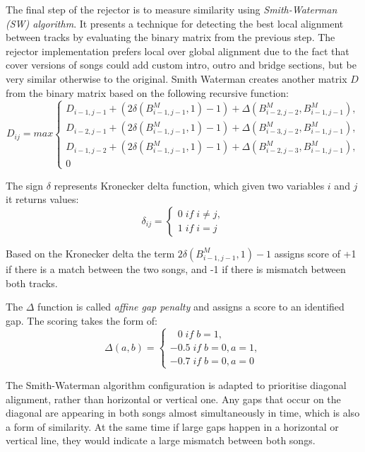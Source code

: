 The final step of the rejector is to measure similarity using
\textit{Smith-Waterman (SW) algorithm}. It presents a technique for detecting
the best local alignment between tracks by evaluating the binary matrix from the
previous step. The rejector implementation prefers local over global alignment
due to the fact that cover versions of songs could add custom intro, outro and
bridge sections, but be very similar otherwise to the original. Smith Waterman
creates another matrix $D$ from the binary matrix based on the following
recursive function:
\begin{equation}
   D_{ij} = max \begin{cases}
    D_{i-1, j-1} + (2\delta(B^M_{i-1, j-1}, 1) - 1) + \Delta(B^M_{i-2, j-2}, B^M_{i-1, j-1}), \\
    D_{i-2, j-1} + (2\delta(B^M_{i-1, j-1}, 1) - 1) + \Delta(B^M_{i-3, j-2}, B^M_{i-1, j-1}), \\
    D_{i-1, j-2} + (2\delta(B^M_{i-1, j-1}, 1) - 1) + \Delta(B^M_{i-2, j-3}, B^M_{i-1, j-1}), \\
    0
   \end{cases}
   \label{eq:sw}
\end{equation}

The sign $\delta$ represents Kronecker delta function, which given two variables
$i$ and $j$ it returns values:
\begin{equation}
    \delta_{ij} = \begin{cases}
       0\; if \; i \neq j, \\
       1\; if \; i = j
    \end{cases}
\end{equation}

Based on the Kronecker delta the term $2\delta(B^M_{i-1, j-1}, 1) - 1$ assigns
score of +1 if there is a match between the two songs, and -1 if there is
mismatch between both tracks.

The $\Delta$ function is called \textit{affine gap penalty} and assigns a score
to an identified gap. The scoring takes the form of:
\begin{equation}
    \Delta(a, b) = \begin{cases}
        \;\;\:0\; if \; b = 1, \\
       -0.5\; if \; b = 0, a = 1, \\
       -0.7\; if \; b = 0, a = 0 
    \end{cases}
\end{equation}

The Smith-Waterman algorithm configuration is adapted to prioritise diagonal
alignment, rather than horizontal or vertical one. Any gaps that occur on the
diagonal are appearing in both songs almost simultaneously in time, which is
also a form of similarity. At the same time if large gaps happen in a horizontal
or vertical line, they would indicate a large mismatch between both songs.

